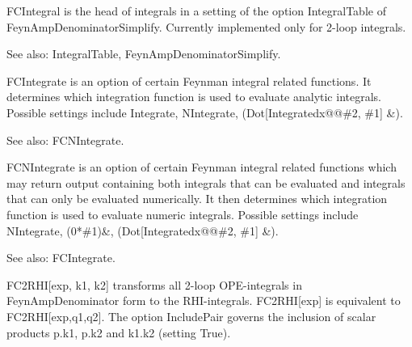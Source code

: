 



FCIntegral is the head of integrals in a setting of the option IntegralTable of FeynAmpDenominatorSimplify. Currently implemented only
  for 2-loop integrals.

See also:  IntegralTable, FeynAmpDenominatorSimplify.



FCIntegrate is an option of certain Feynman integral related functions. It determines which integration function is used to evaluate
  analytic integrals. Possible settings include Integrate, NIntegrate, (Dot[Integratedx@@\#{}2, \#{}1] \&{}).

See also:  FCNIntegrate.



FCNIntegrate is an option of certain Feynman integral related functions which may return output containing both integrals that can be
  evaluated and integrals that can only be evaluated numerically. It then determines which integration function is used to evaluate
  numeric integrals. Possible settings include NIntegrate, (0*\#{}1)\&{}, (Dot[Integratedx@@\#{}2, \#{}1] \&{}).

See also:  FCIntegrate.



FC2RHI[exp, k1, k2] transforms all 2-loop OPE-integrals in FeynAmpDenominator form to the RHI-integrals. { }FC2RHI[exp] is equivalent to
  FC2RHI[exp,q1,q2]. The option IncludePair governs the inclusion { }of scalar products p.k1, p.k2 and k1.k2 (setting True).




